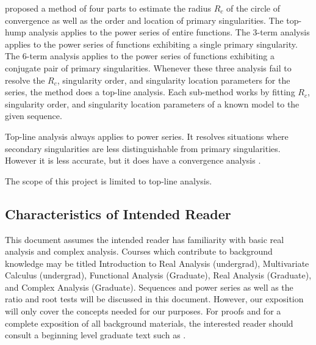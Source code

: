 \documentclass[12pt]{article}
\begin{document}
\cite{chang1982} proposed a method of four parts to estimate the radius $R_c$ of the circle of convergence
as well as the order and location of primary singularities. The top-hump analysis applies to
the power series of entire functions. The 3-term analysis applies to the power series of
functions exhibiting a single primary singularity. The 6-term analysis applies to the
power series of functions exhibiting a conjugate pair of primary singularities.
Whenever these three analysis fail to resolve the $R_c$, singularity order, and
singularity location parameters for the series, the \cite{chang1982} method does
a top-line analysis. Each \cite{chang1982} sub-method works by fitting $R_c$, singularity order, and
singularity location parameters of a known model to the given sequence.

Top-line analysis always applies to power series. It resolves situations where secondary singularities are
less distinguishable from primary singularities. However it is less accurate, but it does
have a convergence analysis \citep{chang1982}.

The scope of this  project is limited to top-line analysis.



\subsection{Characteristics of Intended Reader} \label{sec_IntendedReader}

This document assumes the intended reader has familiarity with basic real analysis and complex analysis.
Courses which contribute to background knowledge may be titled Introduction to Real Analysis (undergrad),
Multivariate Calculus (undergrad), Functional Analysis (Graduate), Real Analysis (Graduate),
and Complex Analysis (Graduate).
Sequences and power series as well as the ratio and root tests will be discussed
in this document. However, our exposition will only cover the concepts needed for our purposes. For proofs
and for a complete exposition of all background materials, the interested reader should consult a beginning
level graduate text such as \cite{rudin1976}.
\end{document}
